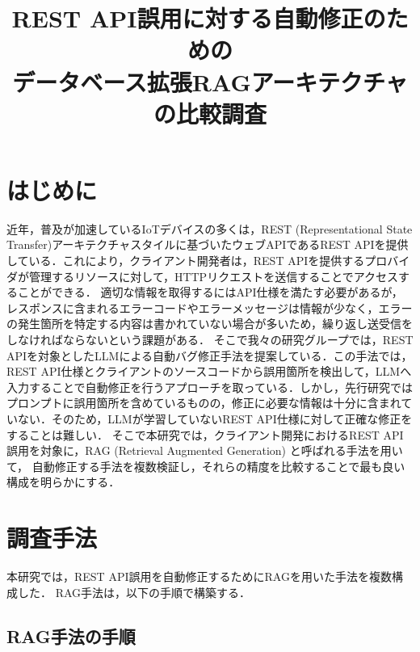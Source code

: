 \documentclass[uplatex,dvipdfmx,a4paper,twocolumn,base=12pt,jbase=12pt,ja=standard]{bxjsarticle}
\title{REST API誤用に対する自動修正のための\\
データベース拡張RAGアーキテクチャの比較調査}{}
\author{}{井上　翔瑛}{Shoei Inoue}
\begin{document}
\maketitle

\section{はじめに}
近年，普及が加速しているIoTデバイスの多くは\cite{makhshari2021iot}，REST (Representational State Transfer)アーキテクチャスタイル\cite{fielding2000architectural}に基づいたウェブAPIであるREST APIを提供している．これにより，クライアント開発者は，REST APIを提供するプロバイダが管理するリソースに対して，HTTPリクエストを送信することでアクセスすることができる．
適切な情報を取得するにはAPI仕様を満たす必要があるが，レスポンスに含まれるエラーコードやエラーメッセージは情報が少なく，エラーの発生箇所を特定する内容は書かれていない場合が多いため，繰り返し送受信をしなければならないという課題がある．
そこで我々の研究グループでは，REST APIを対象としたLLMによる自動バグ修正手法\cite{yamagishi2025automated}を提案している．この手法では，REST API仕様とクライアントのソースコードから誤用箇所を検出して，LLMへ入力することで自動修正を行うアプローチを取っている．しかし，先行研究ではプロンプトに誤用箇所を含めているものの，修正に必要な情報は十分に含まれていない．そのため，LLMが学習していないREST API仕様に対して正確な修正をすることは難しい．
そこで本研究では，クライアント開発におけるREST API誤用を対象に，RAG (Retrieval Augmented Generation) \cite{lewis2020retrieval}と呼ばれる手法を用いて，
自動修正する手法を複数検証し，それらの精度を比較することで最も良い構成を明らかにする．




\section{調査手法}
本研究では，REST API誤用を自動修正するためにRAGを用いた手法を複数構成した．
RAG手法は，以下の手順で構築する．
% 

\subsection{RAG手法の手順}
\end{document}
